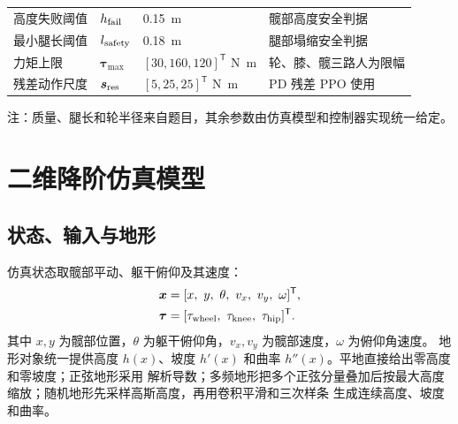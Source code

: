 \documentclass[UTF8,12pt,a4paper,fontset=none]{ctexart}
\begin{document}
\begin{table}[htbp]
\begin{threeparttable}
\begin{tabularx}{\linewidth}{lC{2.4cm}C{2.8cm}Y}
高度失败阈值 & $h_{\rm fail}$ & \SI{0.15}{m} & 髋部高度安全判据 \\
最小腿长阈值 & $l_{\rm safety}$ & \SI{0.18}{m} & 腿部塌缩安全判据 \\
力矩上限 & $\bm\tau_{\max}$ & $[30,160,120]^{\mathsf T}$ \si{N.m} & 轮、膝、髋三路人为限幅 \\
残差动作尺度 & $\bm s_{\rm res}$ & $[5,25,25]^{\mathsf T}$ \si{N.m} & PD 残差 PPO 使用 \\
\bottomrule
\end{tabularx}
\begin{tablenotes}[flushleft]\footnotesize
\item 注：质量、腿长和轮半径来自题目，其余参数由仿真模型和控制器实现统一给定。
\end{tablenotes}
\end{threeparttable}
\end{table}

\section{二维降阶仿真模型}

\subsection{状态、输入与地形}
仿真状态取髋部平动、躯干俯仰及其速度：
\begin{align}
\bm x&=[x,\ y,\ \theta,\ v_x,\ v_y,\ \omega]^{\mathsf T},\\
\bm\tau&=[\tau_{\rm wheel},\ \tau_{\rm knee},\ \tau_{\rm hip}]^{\mathsf T}.
\end{align}
其中 $x,y$ 为髋部位置，$\theta$ 为躯干俯仰角，$v_x,v_y$ 为髋部速度，$\omega$ 为俯仰角速度。
地形对象统一提供高度 $h(x)$、坡度 $h'(x)$ 和曲率 $h''(x)$。平地直接给出零高度和零坡度；正弦地形采用
解析导数；多频地形把多个正弦分量叠加后按最大高度缩放；随机地形先采样高斯高度，再用卷积平滑和三次样条
生成连续高度、坡度和曲率。
\end{document}
